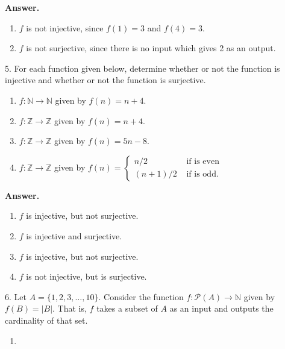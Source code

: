 \documentclass[10pt,]{book}
\theoremstyle{plain}
\theoremstyle{definition}
\theoremstyle{definition}
\theoremstyle{definition}
\numberwithin{equation}{section}
\def\N{\mathbb N}
\def\Z{\mathbb Z}
\def\pow{\mathcal P}
\newcommand{\amp}{ & }
\begin{document}
\begin{exerciselist}
\noindent\textbf{Answer.}\hypertarget{answer-20}{}\quad
\leavevmode%
\begin{enumerate}[label=(\alph*)]
\item\hypertarget{li-195}{}\(f\) is not injective, since \(f(1) = 3\) and \(f(4) = 3\).\item\hypertarget{li-196}{}\(f\) is not surjective, since there is no input which gives 2 as an output.\end{enumerate}
\item[5.]\hypertarget{exercise-21}{}
For each function given below, determine whether or not the function is injective and whether or not the function is surjective.
%
\leavevmode%
\begin{enumerate}[label=(\alph*)]
\item\hypertarget{li-197}{}\(f:\N \to \N\) given by \(f(n) = n+4\).\item\hypertarget{li-198}{}\(f:\Z \to \Z\) given by \(f(n) = n+4\).\item\hypertarget{li-199}{}\(f:\Z \to \Z\) given by \(f(n) = 5n - 8\).\item\hypertarget{li-200}{}\(f:\Z \to \Z\) given by \(f(n) = \begin{cases}n/2 \amp  \mbox{ if  is even} \\
                                         (n+1)/2 \amp  \mbox{ if  is odd} .
\end{cases}\)\end{enumerate}
\par\smallskip
\par\smallskip
\noindent\textbf{Answer.}\hypertarget{answer-21}{}\quad
\leavevmode%
\begin{enumerate}[label=(\alph*)]
\item\hypertarget{li-201}{}\(f\) is injective, but not surjective.\item\hypertarget{li-202}{}\(f\) is injective and surjective.\item\hypertarget{li-203}{}\(f\) is injective, but not surjective.\item\hypertarget{li-204}{}\(f\) is not injective, but is surjective.\end{enumerate}
\item[6.]\hypertarget{exercise-22}{}
Let \(A = \{1,2,3,\ldots,10\}\). Consider the function \(f:\pow(A) \to \N\) given by \(f(B) = |B|\). That is, \(f\) takes a subset of \(A\) as an input and outputs the cardinality of that set.
%
\leavevmode%
\begin{enumerate}[label=(\alph*)]
\item\hypertarget{li-205}{}

\end{enumerate}
\end{exerciselist}
\end{document}
